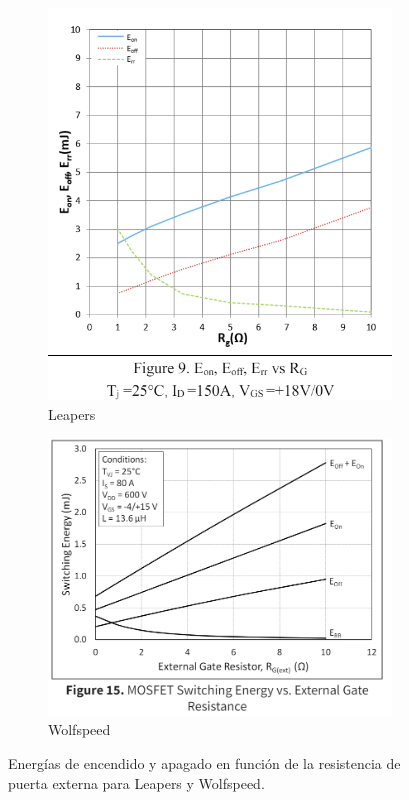 \begin{figure}[H]
	\centering
	\begin{subfigure}[b]{0.4\linewidth}
		\centering
		\includegraphics[width=\linewidth]{fig/eoneoffleapers_RG}
		\caption{Leapers}
	\end{subfigure}
	\hfill
	\begin{subfigure}[b]{0.55\linewidth}
		\centering
		\includegraphics[width=\linewidth]{fig/eoneoffwolfspeed_RG}
		\caption{Wolfspeed}
	\end{subfigure}
	\caption{Energías de encendido y apagado en función de la resistencia de puerta externa para Leapers y Wolfspeed.}
\end{figure}

